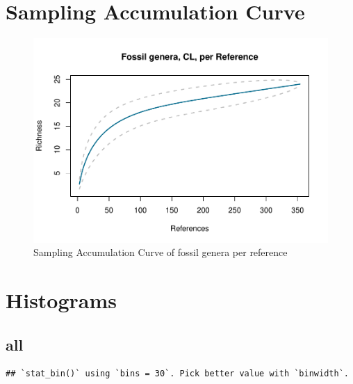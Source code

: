 \documentclass[]{article}
\begin{document}
\newpage

\section{Sampling Accumulation Curve}\label{sampling-accumulation-curve}

\begin{figure}[htbp]
\centering
\includegraphics{MA_JJ_files/figure-latex/Species Accumulation Curve with Genera-1.pdf}
\caption{Sampling Accumulation Curve of fossil genera per reference}
\end{figure}

\newpage

\section{Histograms}\label{histograms}

\subsection{all}\label{all}

\begin{verbatim}
## `stat_bin()` using `bins = 30`. Pick better value with `binwidth`.
\end{verbatim}
\end{document}
